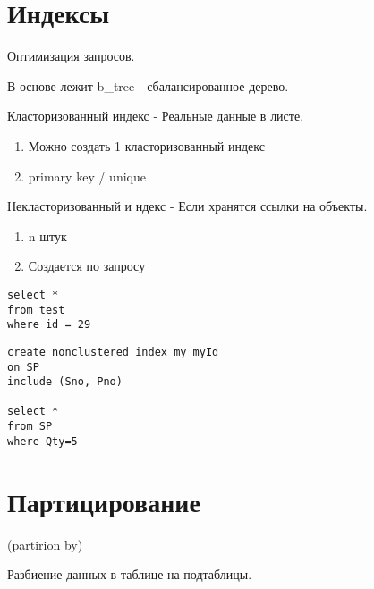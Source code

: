 \section{Индексы}

Оптимизация запросов.

В основе лежит b\_tree - сбалансированное дерево.

Класторизованный индекс - Реальные данные в листе.

\begin{enumerate}
	\item Можно создать 1 класторизованный индекс
	\item primary key / unique
\end{enumerate}

Некласторизованный и ндекс - Если хранятся ссылки на объекты.

\begin{enumerate}
	\item n штук
	\item Создается по запросу
\end{enumerate}


\begin{lstlisting}[label=some-code,caption=Индекс]
select *
from test
where id = 29
\end{lstlisting}

\begin{lstlisting}[label=some-code,caption=Индекс. Создание]
create nonclustered index my myId
on SP
include (Sno, Pno)

select *
from SP
where Qty=5
\end{lstlisting}

\section{Партицирование}

(partirion by)

Разбиение данных в таблице на подтаблицы.